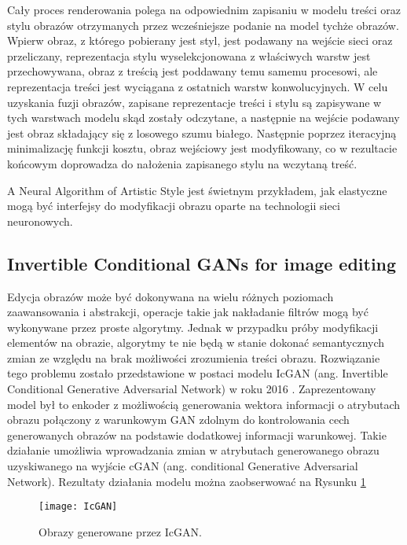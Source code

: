     Cały proces renderowania polega na odpowiednim zapisaniu w modelu treści
    oraz stylu obrazów otrzymanych przez wcześniejsze podanie na model tychże
    obrazów. Wpierw obraz, z którego pobierany jest styl, jest podawany na
    wejście sieci oraz przeliczany, reprezentacja stylu wyselekcjonowana z
    właściwych warstw jest przechowywana, obraz z treścią jest poddawany temu samemu
    procesowi, ale reprezentacja treści jest wyciągana z ostatnich
    warstw konwolucyjnych.
    W celu uzyskania fuzji obrazów, zapisane reprezentacje treści i stylu są
    zapisywane w tych warstwach modelu skąd zostały odczytane, a następnie na wejście
    podawany jest obraz składający się z losowego szumu białego.
    Następnie poprzez iteracyjną minimalizację funkcji kosztu, obraz wejściowy jest modyfikowany, co w rezultacie końcowym doprowadza do nałożenia zapisanego
    stylu na wczytaną treść.

    A Neural Algorithm of Artistic Style jest świetnym przykładem, jak elastyczne
    mogą być interfejsy do modyfikacji obrazu oparte na technologii sieci neuronowych.

  \subsection{Invertible Conditional GANs for image editing}
    Edycja obrazów może być dokonywana na wielu różnych poziomach zaawansowania
    i abstrakcji, operacje takie jak nakładanie filtrów mogą być
    wykonywane przez proste algorytmy. Jednak w przypadku próby modyfikacji
    elementów na obrazie, algorytmy te nie będą w stanie dokonać semantycznych
    zmian ze względu na brak możliwości zrozumienia treści obrazu. Rozwiązanie
    tego problemu zostało przedstawione w postaci modelu IcGAN
    (ang. Invertible Conditional Generative Adversarial Network) w roku 2016
    \cite{gan_editing}. Zaprezentowany model był to enkoder z możliwością
    generowania wektora informacji o atrybutach obrazu połączony z warunkowym
    GAN zdolnym do kontrolowania cech generowanych obrazów na podstawie dodatkowej
    informacji warunkowej. Takie działanie umożliwia wprowadzania zmian w
    atrybutach generowanego obrazu uzyskiwanego na wyjście cGAN (ang. conditional Generative
    Adversarial Network). Rezultaty działania modelu można zaobserwować na
    Rysunku \ref{fig:IcGAN}

    \begin{figure}[ht]
      \centering
      \texttt{[image: IcGAN]}
      \caption{Obrazy generowane przez IcGAN.}
      \label{fig:IcGAN}
    \end{figure}

